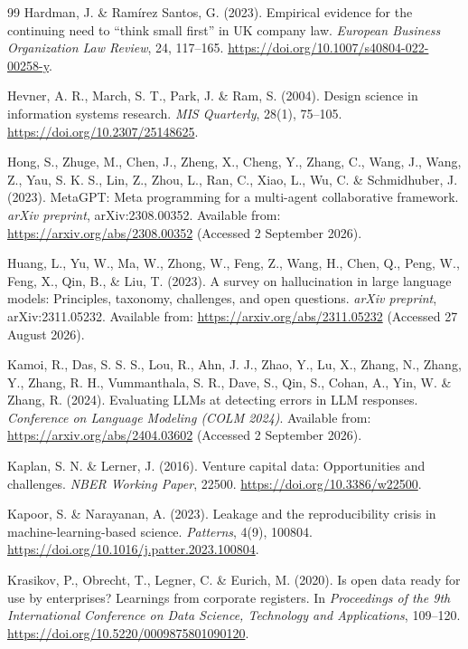 \begin{thebibliography}{99}
Hardman, J. \& Ram\'irez Santos, G. (2023).
Empirical evidence for the continuing need to ``think small first'' in UK company law.
\emph{European Business Organization Law Review}, 24, 117--165.
\url{https://doi.org/10.1007/s40804-022-00258-y}.

Hevner, A. R., March, S. T., Park, J. \& Ram, S. (2004).
Design science in information systems research.
\emph{MIS Quarterly}, 28(1), 75--105.
\url{https://doi.org/10.2307/25148625}.

Hong, S., Zhuge, M., Chen, J., Zheng, X., Cheng, Y., Zhang, C., Wang, J., Wang, Z.,
Yau, S. K. S., Lin, Z., Zhou, L., Ran, C., Xiao, L., Wu, C. \& Schmidhuber, J. (2023).
MetaGPT: Meta programming for a multi-agent collaborative framework.
\emph{arXiv preprint}, arXiv:2308.00352.
Available from: \url{https://arxiv.org/abs/2308.00352} (Accessed 2 September 2026).

Huang, L., Yu, W., Ma, W., Zhong, W., Feng, Z., Wang, H., Chen, Q., Peng, W., Feng, X., Qin, B.,
\& Liu, T. (2023).
A survey on hallucination in large language models: Principles, taxonomy, challenges, and open
questions. \emph{arXiv preprint}, arXiv:2311.05232.
Available from: \url{https://arxiv.org/abs/2311.05232} (Accessed 27 August 2026).

Kamoi, R., Das, S. S. S., Lou, R., Ahn, J. J., Zhao, Y., Lu, X., Zhang, N., Zhang, Y.,
Zhang, R. H., Vummanthala, S. R., Dave, S., Qin, S., Cohan, A., Yin, W. \& Zhang, R.
(2024).
Evaluating LLMs at detecting errors in LLM responses.
\emph{Conference on Language Modeling (COLM 2024)}.
Available from: \url{https://arxiv.org/abs/2404.03602} (Accessed 2 September 2026).

Kaplan, S. N. \& Lerner, J. (2016).
Venture capital data: Opportunities and challenges.
\emph{NBER Working Paper}, 22500. \url{https://doi.org/10.3386/w22500}.

Kapoor, S. \& Narayanan, A. (2023).
Leakage and the reproducibility crisis in machine-learning-based science.
\emph{Patterns}, 4(9), 100804.
\url{https://doi.org/10.1016/j.patter.2023.100804}.

Krasikov, P., Obrecht, T., Legner, C. \& Eurich, M. (2020).
Is open data ready for use by enterprises? Learnings from corporate registers.
In \emph{Proceedings of the 9th International Conference on Data Science, Technology and
Applications}, 109--120. \url{https://doi.org/10.5220/0009875801090120}.


\end{thebibliography}
